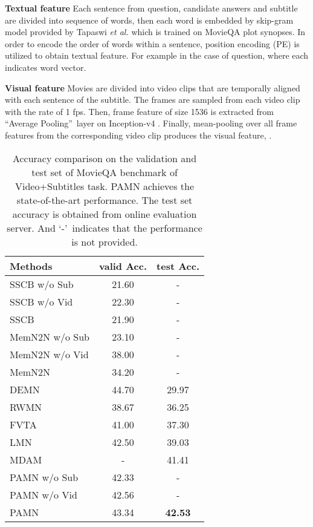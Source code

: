 \documentclass[10pt,twocolumn,letterpaper]{article}
\begin{document}
\textbf{Textual feature} Each sentence from question, candidate answers and subtitle are divided into sequence of words, then each word is embedded by skip-gram model \cite{word2vec} provided by Tapaswi \textit{et al.} \cite{MovieQA} which is trained on MovieQA plot synopses. In order to encode the order of words within a sentence, position encoding (PE) \cite{e2ememory} is utilized to obtain textual feature. For example in the case of question,  where each  indicates word vector.

\textbf{Visual feature} Movies are divided into video clips that are temporally aligned with each sentence of the subtitle. The frames are sampled from each video clip with the rate of 1 fps. Then, frame feature of size 1536 is extracted from \textquotedblleft Average Pooling\textquotedblright\ layer on Inception-v4 \cite{inception}. Finally, mean-pooling over all frame features from the corresponding video clip produces the visual feature, .

\begin{table}[t]
	\begin{center}
		\begin{tabular}{l||c|c}
			\hline
			Methods                        & valid Acc. & test Acc.    \\ 
			\hline \hline
			SSCB w/o Sub                   & 21.60 & -                 \\
			SSCB w/o Vid                   & 22.30 & -                 \\
			SSCB \cite{MovieQA}            & 21.90 & -                 \\
			MemN2N w/o Sub                 & 23.10 & -                 \\
			MemN2N w/o Vid                 & 38.00 & -                 \\
			MemN2N \cite{MovieQA}          & 34.20 & -                 \\
			DEMN \cite{demn}               & 44.70 & 29.97             \\
			RWMN \cite{rwmn}               & 38.67 & 36.25             \\
			FVTA \cite{fvta}               & 41.00 & 37.30             \\
			LMN \cite{lmn}                 & 42.50 & 39.03             \\
			MDAM \cite{mdam}               & - & 41.41             \\
			\hline
			PAMN w/o Sub                   & 42.33 & -                 \\
			PAMN w/o Vid                   & 42.56 & -                 \\
			PAMN                           & 43.34 & \textbf{42.53}    \\
			\hline
		\end{tabular}
	\end{center}
	\caption{Accuracy comparison on the validation and test set of MovieQA benchmark of Video+Subtitles task. PAMN achieves the state-of-the-art performance. The test set accuracy is obtained from online evaluation server. And \textquoteleft-\textquoteright\ indicates that the performance is not provided.}
	\label{tab:acc}
\end{table}
\end{document}
